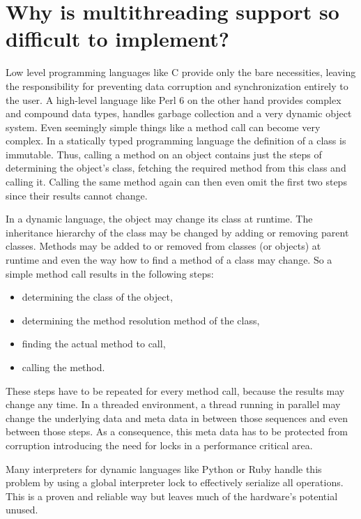 \documentclass[bachelor,english]{hgbthesis}
\begin{document}
\section{Why is multithreading support so difficult to implement?}

Low level programming languages like C provide only the bare necessities, leaving the responsibility for preventing data corruption and synchronization entirely to the user. A high-level language like Perl 6 on the other hand provides complex and compound data types, handles garbage collection and a very dynamic object system. Even seemingly simple things like a method call can become very complex. In a statically typed programming language the definition of a class is immutable. Thus, calling a method on an object contains just the steps of determining the object's class, fetching the required method from this class and calling it. Calling the same method again can then even omit the first two steps since their results cannot change.

In a dynamic language, the object may change its class at runtime. The inheritance hierarchy of the class may be changed by adding or removing parent classes. Methods may be added to or removed from classes (or objects) at runtime and even the way how to find a method of a class may change. So a simple method call results in the following steps:
%
\begin{itemize}
\item determining the class of the object,
\item determining the method resolution method of the class,
\item finding the actual method to call,
\item calling the method.
\end{itemize}
%
These steps have to be repeated for every method call, because the results may change any time. In a threaded environment, a thread running in parallel may change the underlying data and meta data in between those sequences and even between those steps. As a consequence, this meta data has to be protected from corruption introducing the need for locks in a performance critical area.

Many interpreters for dynamic languages like Python \cite{LearningPython} or Ruby \cite{TheRubyProgrammingLanguage} handle this problem by using a global interpreter lock to effectively serialize all operations. This is a proven and reliable way but leaves much of the hardware's potential unused.
\end{document}
